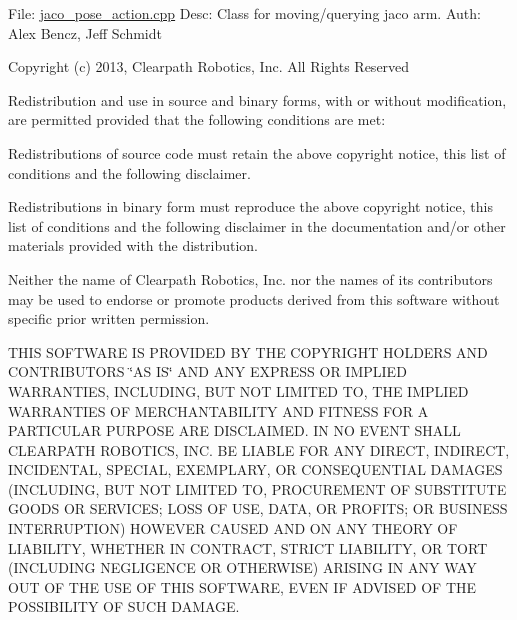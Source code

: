 File\+: \hyperlink{jaco__pose__action_8cpp}{jaco\+\_\+pose\+\_\+action.\+cpp} Desc\+: Class for moving/querying jaco arm. Auth\+: Alex Bencz, Jeff Schmidt

Copyright (c) 2013, Clearpath Robotics, Inc. All Rights Reserved

Redistribution and use in source and binary forms, with or without modification, are permitted provided that the following conditions are met\+:
\begin{DoxyItemize}
\item Redistributions of source code must retain the above copyright notice, this list of conditions and the following disclaimer.
\item Redistributions in binary form must reproduce the above copyright notice, this list of conditions and the following disclaimer in the documentation and/or other materials provided with the distribution.
\item Neither the name of Clearpath Robotics, Inc. nor the names of its contributors may be used to endorse or promote products derived from this software without specific prior written permission.
\end{DoxyItemize}

T\+H\+IS S\+O\+F\+T\+W\+A\+RE IS P\+R\+O\+V\+I\+D\+ED BY T\+HE C\+O\+P\+Y\+R\+I\+G\+HT H\+O\+L\+D\+E\+RS A\+ND C\+O\+N\+T\+R\+I\+B\+U\+T\+O\+RS \char`\"{}\+A\+S I\+S\char`\"{} A\+ND A\+NY E\+X\+P\+R\+E\+SS OR I\+M\+P\+L\+I\+ED W\+A\+R\+R\+A\+N\+T\+I\+ES, I\+N\+C\+L\+U\+D\+I\+NG, B\+UT N\+OT L\+I\+M\+I\+T\+ED TO, T\+HE I\+M\+P\+L\+I\+ED W\+A\+R\+R\+A\+N\+T\+I\+ES OF M\+E\+R\+C\+H\+A\+N\+T\+A\+B\+I\+L\+I\+TY A\+ND F\+I\+T\+N\+E\+SS F\+OR A P\+A\+R\+T\+I\+C\+U\+L\+AR P\+U\+R\+P\+O\+SE A\+RE D\+I\+S\+C\+L\+A\+I\+M\+ED. IN NO E\+V\+E\+NT S\+H\+A\+LL C\+L\+E\+A\+R\+P\+A\+TH R\+O\+B\+O\+T\+I\+CS, I\+NC. BE L\+I\+A\+B\+LE F\+OR A\+NY D\+I\+R\+E\+CT, I\+N\+D\+I\+R\+E\+CT, I\+N\+C\+I\+D\+E\+N\+T\+AL, S\+P\+E\+C\+I\+AL, E\+X\+E\+M\+P\+L\+A\+RY, OR C\+O\+N\+S\+E\+Q\+U\+E\+N\+T\+I\+AL D\+A\+M\+A\+G\+ES (I\+N\+C\+L\+U\+D\+I\+NG, B\+UT N\+OT L\+I\+M\+I\+T\+ED TO, P\+R\+O\+C\+U\+R\+E\+M\+E\+NT OF S\+U\+B\+S\+T\+I\+T\+U\+TE G\+O\+O\+DS OR S\+E\+R\+V\+I\+C\+ES; L\+O\+SS OF U\+SE, D\+A\+TA, OR P\+R\+O\+F\+I\+TS; OR B\+U\+S\+I\+N\+E\+SS I\+N\+T\+E\+R\+R\+U\+P\+T\+I\+ON) H\+O\+W\+E\+V\+ER C\+A\+U\+S\+ED A\+ND ON A\+NY T\+H\+E\+O\+RY OF L\+I\+A\+B\+I\+L\+I\+TY, W\+H\+E\+T\+H\+ER IN C\+O\+N\+T\+R\+A\+CT, S\+T\+R\+I\+CT L\+I\+A\+B\+I\+L\+I\+TY, OR T\+O\+RT (I\+N\+C\+L\+U\+D\+I\+NG N\+E\+G\+L\+I\+G\+E\+N\+CE OR O\+T\+H\+E\+R\+W\+I\+SE) A\+R\+I\+S\+I\+NG IN A\+NY W\+AY O\+UT OF T\+HE U\+SE OF T\+H\+IS S\+O\+F\+T\+W\+A\+RE, E\+V\+EN IF A\+D\+V\+I\+S\+ED OF T\+HE P\+O\+S\+S\+I\+B\+I\+L\+I\+TY OF S\+U\+CH D\+A\+M\+A\+GE.

